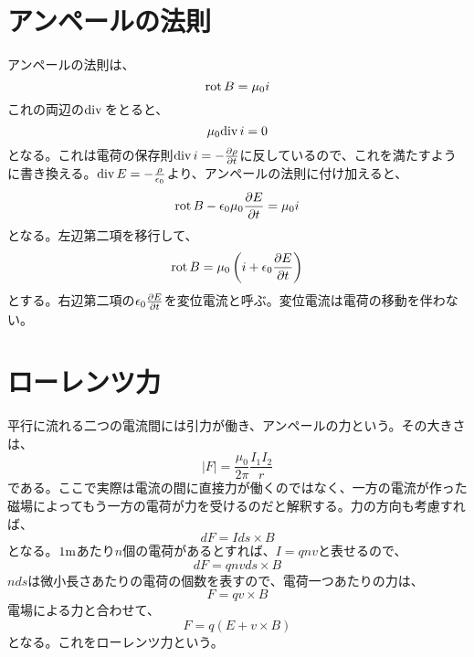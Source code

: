     \section{アンペールの法則}
        アンペールの法則は、
            \[\rot B = \mu_0i\]
        これの両辺の$\dive$をとると、
            \[\mu_0\dive i = 0\]
        となる。これは電荷の保存則$\dive i = -\pd[\rho]{t}$に反しているので、これを満たすように書き換える。$\dive E = -\frac{\rho}{\epsilon_0}$より、アンペールの法則に付け加えると、
            \[\rot B - \epsilon_0\mu_0\pd[E]{t} = \mu_0 i\]
        となる。左辺第二項を移行して、
            \[\rot B = \mu_0\lr{i + \epsilon_0\pd[E]{t}}\]
        とする。右辺第二項の$\epsilon_0\pd[E]{t}$を変位電流と呼ぶ。変位電流は電荷の移動を伴わない。
    \section{ローレンツ力}
        平行に流れる二つの電流間には引力が働き、アンペールの力という。その大きさは、
            \[|F| = \frac{\mu_0}{2\pi}\frac{I_1 I_2}{r}\]
        である。ここで実際は電流の間に直接力が働くのではなく、一方の電流が作った磁場によってもう一方の電荷が力を受けるのだと解釈する。力の方向も考慮すれば、
            \[dF = Ids\times B\]
        となる。$1\rm{m}$あたり$n$個の電荷があるとすれば、$I=qnv$と表せるので、
            \[dF = qnvds\times B\]
        $nds$は微小長さあたりの電荷の個数を表すので、電荷一つあたりの力は、
            \[F = qv\times B\]
        電場による力と合わせて、
            \[F = q(E+v\times B)\]
        となる。これをローレンツ力という。